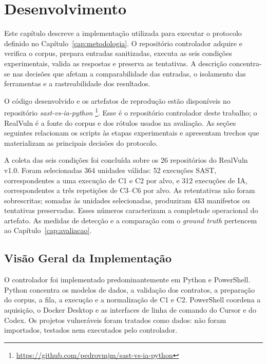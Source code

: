 \chapter{Desenvolvimento}\label{cap:desenvolvimento}

Este capítulo descreve a implementação utilizada para executar o protocolo definido no Capítulo~\ref{cap:metodologia}. O repositório controlador adquire e verifica o corpus, prepara entradas sanitizadas, executa as seis condições experimentais, valida as respostas e preserva as tentativas. A descrição concentra-se nas decisões que afetam a comparabilidade das entradas, o isolamento das ferramentas e a rastreabilidade dos resultados.

O código desenvolvido e os artefatos de reprodução estão disponíveis no repositório \textit{sast-vs-ia-python} \cite{Motta2026Repositorio}\footnote{\url{https://github.com/pedrovmjm/sast-vs-ia-python}}. Esse é o repositório controlador deste trabalho; o RealVuln é a fonte do corpus e dos rótulos usados na avaliação. As seções seguintes relacionam os scripts às etapas experimentais e apresentam trechos que materializam as principais decisões do protocolo.

A coleta das seis condições foi concluída sobre os 26 repositórios do RealVuln v1.0. Foram selecionadas 364 unidades válidas: 52 execuções SAST, correspondentes a uma execução de C1 e C2 por alvo, e 312 execuções de IA, correspondentes a três repetições de C3--C6 por alvo. As retentativas não foram sobrescritas; somadas às unidades selecionadas, produziram 433 manifestos ou tentativas preservadas. Esses números caracterizam a completude operacional do artefato. As medidas de detecção e a comparação com o \textit{ground truth} pertencem ao Capítulo~\ref{cap:avaliacao}.

\section{Visão Geral da Implementação}\label{sec:visao-geral-desenvolvimento}

O controlador foi implementado predominantemente em Python e PowerShell. Python concentra os modelos de dados, a validação dos contratos, a preparação do corpus, a fila, a execução e a normalização de C1 e C2. PowerShell coordena a aquisição, o Docker Desktop e as interfaces de linha de comando do Cursor e do Codex. Os projetos vulneráveis foram tratados como dados: não foram importados, testados nem executados pelo controlador.

